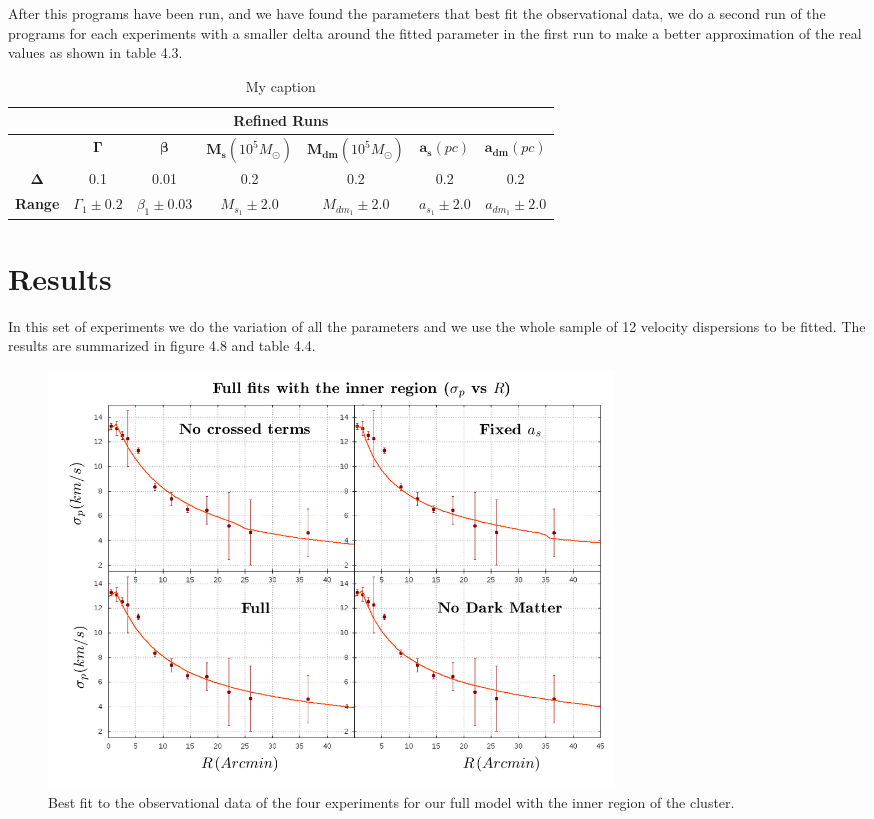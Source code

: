 After this programs have been run, and we have found the parameters that best fit the observational data, we do a second run of the programs for each experiments with a smaller delta around the fitted parameter in the first run to make a better approximation of the real values as shown in table 4.3.

\begin{table}[H]
\centering
\label{my-label}
\begin{tabular}{|c|c|c|c|c|c|c|}
\hline
\multicolumn{7}{|c|}{\textbf{Refined Runs}}                                                                          \\ \hline
               & \textbf{$\mathbf{\Gamma}$} & \textbf{$\mathbf{\beta}$} & \textbf{$\mathbf{M_{s}}(10^{5} M_{\odot})$} & \textbf{$\mathbf{M_{dm}}(10^{5} M_{\odot})$} & \textbf{$\mathbf{a_{s}}(pc)$} & \textbf{$\mathbf{a_{dm}}(pc)$} \\ \hline
\textbf{$\mathbf{\Delta}$}  &  0.1 &  0.01     &  0.2    &  0.2   &  0.2    &  0.2          \\ \hline
\textbf{Range} & $\Gamma_{1}\pm 0.2$   & $\beta_{1}\pm 0.03$        & $M_{s}_{1}\pm 2.0$      & $M_{dm}_{1}\pm 2.0$   & $a_{s}_{1}\pm 2.0$      & $a_{dm}_{1}\pm 2.0$            \\ \hline
\end{tabular}
\caption{My caption}
\end{table}


\section{Results}

In this set of experiments we do the variation of all the parameters and we use the whole sample of 12 velocity dispersions to be fitted. The results are summarized in figure 4.8 and table 4.4.

\begin{figure}[H]
\centering
\includegraphics[width=15cm]{images/all_params_refinado_12.png}
\caption[Best fit of the full model with the inner region]{Best fit to the observational data of the four experiments for our full model with the inner region of the cluster.}
\end{figure}

